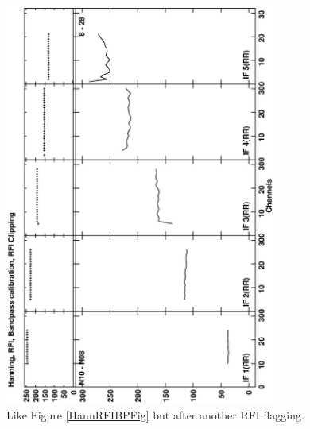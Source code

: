 \documentclass[journal]{IEEEtran}
\begin{document}
\begin{figure}
\includegraphics[angle=-90,width=3.5in]{figs/HannRFIBPRFI.eps}
\caption{ 
Like Figure \ref{HannRFIBPFig} but after another RFI flagging.
} 
\label{HannRFIBPRFIFig}
\end{figure}
\end{document}
